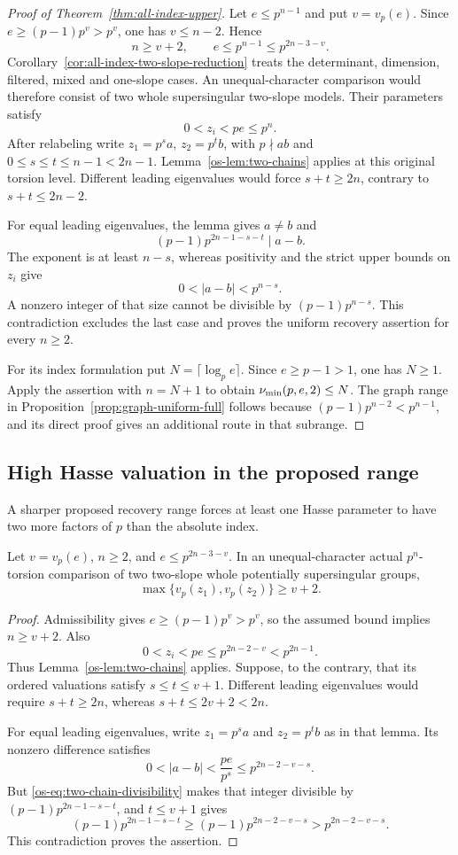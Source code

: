\begin{proof}[Proof of Theorem~\ref{thm:all-index-upper}]
Let $e\le p^{n-1}$ and put $v=v_p(e)$. Since $e\ge(p-1)p^v>p^v$, one has $v\le n-2$. Hence
\[
 n\ge v+2,\qquad e\le p^{n-1}\le p^{2n-3-v}.
\]
Corollary~\ref{cor:all-index-two-slope-reduction} treats the determinant, dimension, filtered, mixed and one-slope cases. An unequal-character comparison would therefore consist of two whole supersingular two-slope models. Their parameters satisfy
\[
 0<z_i<pe\le p^n.
\]
After relabeling write $z_1=p^s a$, $z_2=p^t b$, with $p\nmid ab$ and $0\le s\le t\le n-1<2n-1$. Lemma~\ref{os-lem:two-chains} applies at this original torsion level. Different leading eigenvalues would force $s+t\ge2n$, contrary to $s+t\le2n-2$.

For equal leading eigenvalues, the lemma gives $a\ne b$ and
\[
 (p-1)p^{2n-1-s-t}\mid a-b.
\]
The exponent is at least $n-s$, whereas positivity and the strict upper bounds on $z_i$ give
\[
 0<|a-b|<p^{n-s}.
\]
A nonzero integer of that size cannot be divisible by $(p-1)p^{n-s}$. This contradiction excludes the last case and proves the uniform recovery assertion for every $n\ge2$.

For its index formulation put $N=\lceil\log_p e\rceil$. Since $e\ge p-1>1$, one has $N\ge1$. Apply the assertion with $n=N+1$ to obtain $\nu_{\min}(p,e,2)\le N$. The graph range in Proposition~\ref{prop:graph-uniform-full} follows because $(p-1)p^{n-2}<p^{n-1}$, and its direct proof gives an additional route in that subrange.
\end{proof}

\subsection{High Hasse valuation in the proposed range}
A sharper proposed recovery range forces at least one Hasse parameter to have two more factors of $p$ than the absolute index.

\begin{lemma}\label{os-lem:high-hasse}
Let $v=v_p(e)$, $n\ge2$, and $e\le p^{2n-3-v}$.  In an
unequal-character actual $p^n$-torsion comparison of two two-slope
whole potentially supersingular groups,
\[
 \max\{v_p(z_1),v_p(z_2)\}\ge v+2.
\]
\end{lemma}

\begin{proof}
Admissibility gives $e\ge(p-1)p^v>p^v$, so the assumed bound implies
$n\ge v+2$.  Also
\[
 0<z_i<pe\le p^{2n-2-v}<p^{2n-1}.
\]
Thus Lemma~\ref{os-lem:two-chains} applies.  Suppose, to the contrary,
that its ordered valuations satisfy $s\le t\le v+1$.
Different leading eigenvalues would require $s+t\ge2n$, whereas
$s+t\le2v+2<2n$.

For equal leading eigenvalues, write $z_1=p^sa$ and $z_2=p^tb$ as
in that lemma.  Its nonzero difference satisfies
\[
 0<|a-b|<\frac{pe}{p^s}\le p^{2n-2-v-s}.
\]
But \eqref{os-eq:two-chain-divisibility} makes that integer divisible
by $(p-1)p^{2n-1-s-t}$, and $t\le v+1$ gives
\[
 (p-1)p^{2n-1-s-t}\ge(p-1)p^{2n-2-v-s}
 >p^{2n-2-v-s}.
\]
This contradiction proves the assertion.
\end{proof}

